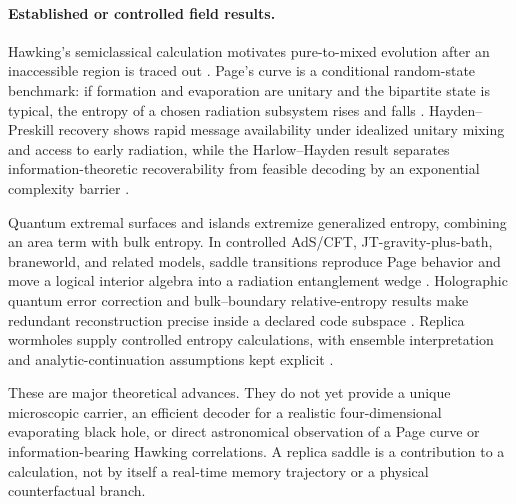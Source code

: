 \paragraph{Established or controlled field results.}
Hawking's semiclassical calculation motivates pure-to-mixed evolution after an
inaccessible region is traced out \citep{Hawking1976Breakdown}.  Page's curve
is a conditional random-state benchmark: if formation and evaporation are
unitary and the bipartite state is typical, the entropy of a chosen radiation
subsystem rises and falls \citep{Page1993Information}.  Hayden--Preskill
recovery shows rapid message availability under idealized unitary mixing and
access to early radiation, while the Harlow--Hayden result separates
information-theoretic recoverability from feasible decoding by an exponential
complexity barrier \citep{HaydenPreskill2007Mirrors,
HarlowHayden2013Computation}.

Quantum extremal surfaces and islands extremize generalized entropy, combining
an area term with bulk entropy.  In controlled AdS/CFT, JT-gravity-plus-bath,
braneworld, and related models, saddle transitions reproduce Page behavior and
move a logical interior algebra into a radiation entanglement wedge
\citep{EngelhardtWall2015QES,Penington2020EntanglementWedge,
AlmheiriEtAl2019BulkEntropy}.  Holographic quantum error correction and
bulk--boundary relative-entropy results make redundant reconstruction precise
inside a declared code subspace
\citep{AlmheiriDongHarlow2015QEC,JafferisEtAl2016RelativeEntropy}.  Replica
wormholes supply controlled entropy calculations, with ensemble interpretation
and analytic-continuation assumptions kept explicit
\citep{PeningtonEtAl2022ReplicaWormholes,
AlmheiriEtAl2020ReplicaWormholes}.

These are major theoretical advances.  They do not yet provide a unique
microscopic carrier, an efficient decoder for a realistic four-dimensional
evaporating black hole, or direct astronomical observation of a Page curve or
information-bearing Hawking correlations.  A replica saddle is a contribution
to a calculation, not by itself a real-time memory trajectory or a physical
counterfactual branch.

